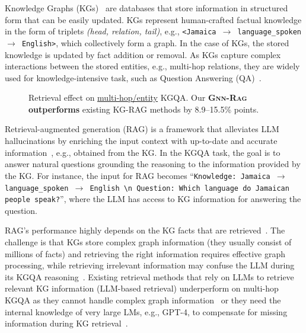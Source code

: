 \documentclass{article}
\newcommand{\grag}{\textsc{Gnn-Rag}\xspace}
\theoremstyle{plain}
\theoremstyle{definition}
\theoremstyle{remark}
\begin{document}
Knowledge Graphs (KGs)~\citep{vrandevcic2014wikidata} are databases that store information in structured form that can be easily updated. KGs represent human-crafted factual knowledge in the form of triplets \textit{(head, relation, tail)}, e.g., \texttt{<Jamaica $\rightarrow$ language\_spoken $\rightarrow$ English>}, which collectively form a graph. In the case of KGs, the stored knowledge is updated by fact addition or removal. As KGs capture complex interactions between the stored entities, e.g., multi-hop relations, they are widely used for knowledge-intensive task, such as Question Answering (QA)~\citep{pan2024unifying}. 



\begin{figure} %
    \centering
    \vspace{-0.25in}
    
    \caption{Retrieval effect on  \underline{multi-hop/entity} KGQA. Our \textbf{\grag} \textbf{outperforms} existing KG-RAG methods by 8.9--15.5\% points. }
    \vspace{-0.15in}
    \label{fig:intro}
\end{figure}


Retrieval-augmented generation (RAG) is a framework that alleviates LLM hallucinations by enriching the input context with up-to-date and accurate information~\citep{lewis2020retrieval}, e.g., obtained from the KG. In the KGQA task, the goal is to answer natural questions grounding the reasoning to the information provided by the KG. For instance, the input for RAG becomes ``\texttt{Knowledge: Jamaica $\rightarrow$ language\_spoken $\rightarrow$ English \textbackslash n Question: Which language do Jamaican people speak?}'', where the LLM has access to KG information for answering the question. 




RAG's performance highly depends on the KG facts that are retrieved~\citep{wu2023retrieve}. The challenge is that KGs store complex graph information (they usually consist of millions of facts) and retrieving the right information requires effective graph processing, while retrieving irrelevant information may confuse the LLM during its KGQA reasoning~\citep{he2024gretriever}. Existing retrieval methods that rely on LLMs to retrieve relevant KG information (LLM-based retrieval) underperform on multi-hop KGQA as they cannot handle complex graph information~\citep{baek2023knowledge,luo2024rog} or they need the internal knowledge of very large LMs, e.g., GPT-4, to compensate for missing information during KG retrieval~\citep{sun2024tog}. 
\end{document}
